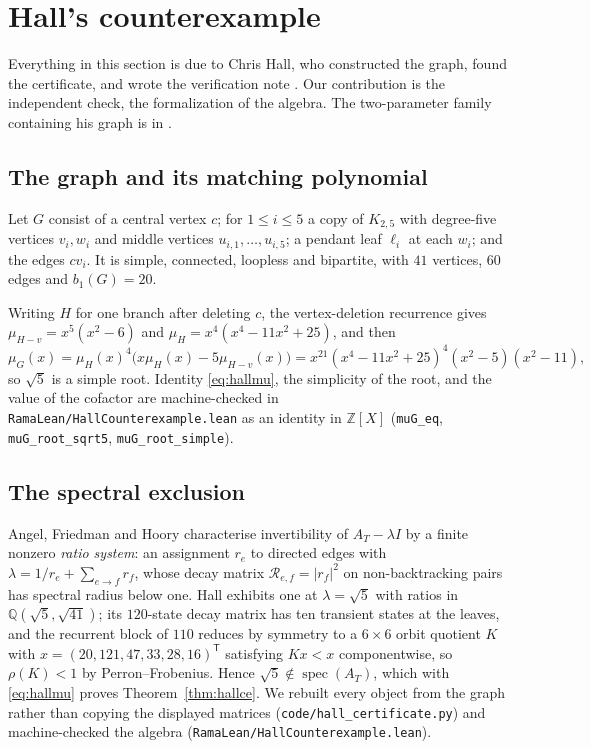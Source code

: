 \documentclass[11pt]{article}
\theoremstyle{remark}
\begin{document}
\section{Hall's counterexample}\label{sec:hallce}

Everything in this section is due to Chris Hall, who
constructed the graph, found the certificate, and wrote the verification note
\cite{HallCE}. Our contribution is the independent check, the formalization of the
algebra. The two-parameter family containing his graph is in \cite{Supp}.

\subsection{The graph and its matching polynomial}

Let $G$ consist of a central vertex $c$; for $1\le i\le5$ a copy of $K_{2,5}$ with
degree-five vertices $v_i,w_i$ and middle vertices $u_{i,1},\dots,u_{i,5}$; a pendant leaf
$\ell_i$ at each $w_i$; and the edges $cv_i$. It is simple, connected, loopless and
bipartite, with $41$ vertices, $60$ edges and $b_1(G)=20$.

Writing $H$ for one branch after deleting $c$, the vertex-deletion recurrence gives
$\mu_{H-v}=x^5(x^2-6)$ and $\mu_H=x^4(x^4-11x^2+25)$, and then
\begin{equation}\label{eq:hallmu}
   \mu_G(x)=\mu_H(x)^4\bigl(x\mu_H(x)-5\mu_{H-v}(x)\bigr)
   =x^{21}(x^4-11x^2+25)^4(x^2-5)(x^2-11),
\end{equation}
so $\sqrt5$ is a simple root. Identity \eqref{eq:hallmu}, the simplicity of the root, and
the value of the cofactor are machine-checked in \texttt{RamaLean/HallCounterexample.lean}
as an identity in $\mathbb Z[X]$ (\texttt{muG\_eq}, \texttt{muG\_root\_sqrt5},
\texttt{muG\_root\_simple}).

\subsection{The spectral exclusion}

Angel, Friedman and Hoory \cite{AFH} characterise invertibility of $A_T-\lambda I$ by a finite
nonzero \emph{ratio system}: an assignment $r_e$ to directed edges with
$\lambda=1/r_e+\sum_{e\to f}r_f$, whose decay matrix $\mathcal R_{e,f}=|r_f|^2$ on
non-backtracking pairs has spectral radius below one. Hall exhibits one at $\lambda=\sqrt5$ with
ratios in $\mathbb Q(\sqrt5,\sqrt{41})$; its $120$-state decay matrix has ten transient states at
the leaves, and the recurrent block of $110$ reduces by symmetry to a $6\times6$ orbit quotient
$K$ with $x=(20,121,47,33,28,16)^{\mathsf T}$ satisfying $Kx<x$ componentwise, so $\rho(K)<1$ by
Perron--Frobenius. Hence $\sqrt5\notin\operatorname{spec}(A_T)$, which with \eqref{eq:hallmu}
proves Theorem~\ref{thm:hallce}. We rebuilt every object from the graph rather than copying the
displayed matrices (\texttt{code/hall\_certificate.py}) and machine-checked the algebra
(\texttt{RamaLean/HallCounterexample.lean}).
\end{document}
